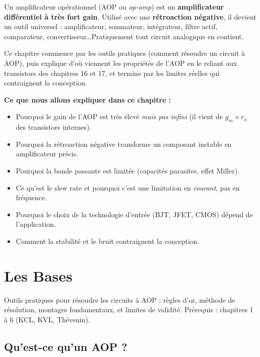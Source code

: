 \documentclass[12pt,a4paper,twoside]{book}
\begin{document}
\vspace{0.5cm}

Un amplificateur opérationnel (AOP ou \textit{op-amp}) est un \textbf{amplificateur différentiel à très fort gain}. Utilisé avec une \textbf{rétroaction négative}, il devient un outil universel : amplificateur, sommateur, intégrateur, filtre actif, comparateur, convertisseur\ldots Pratiquement tout circuit analogique en contient.

Ce chapitre commence par les outils pratiques (comment résoudre un circuit à AOP), puis explique d'où viennent les propriétés de l'AOP en le reliant aux transistors des chapitres 16 et 17, et termine par les limites réelles qui contraignent la conception.

\begin{intuition}
\textbf{Ce que nous allons expliquer dans ce chapitre :}
\begin{itemize}[nosep]
\item Pourquoi le gain de l'AOP est très élevé \textit{mais pas infini} (il vient de $g_m \times r_o$ des transistors internes).
\item Pourquoi la rétroaction négative transforme un composant instable en amplificateur précis.
\item Pourquoi la bande passante est limitée (capacités parasites, effet Miller).
\item Ce qu'est le slew rate et pourquoi c'est une limitation en \textit{courant}, pas en fréquence.
\item Pourquoi le choix de la technologie d'entrée (BJT, JFET, CMOS) dépend de l'application.
\item Comment la stabilité et le bruit contraignent la conception.
\end{itemize}
\end{intuition}

\section{Les Bases}

\begin{bases}
Outils pratiques pour résoudre les circuits à AOP : règles d'or, méthode de résolution, montages fondamentaux, et limites de validité. Prérequis : chapitres 1 à 6 (KCL, KVL, Thévenin).
\end{bases}

\subsection{Qu'est-ce qu'un AOP ?}
\end{document}
